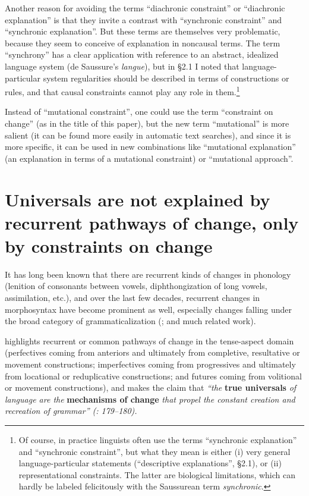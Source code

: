 \documentclass[output=paper]{langsci/langscibook}
\begin{document}
Another reason for avoiding the terms “diachronic constraint” or “diachronic explanation” is that they invite a contrast with “synchronic constraint” and “synchronic explanation”. But these terms are themselves very problematic, because they seem to conceive of explanation in noncausal terms. The term “synchrony” has a clear application with reference to an abstract, idealized language system (de Saussure’s \textit{langue}), but in §2.1 I noted that language-particular system regularities should be described in terms of constructions or rules, and that causal constraints cannot play any role in them.\footnote{Of course, in practice linguists often use the terms “synchronic explanation” and “synchronic constraint”, but what they mean is either (i) very general language-particular statements (“descriptive explanations”, §2.1), or (ii) representational constraints. The latter are biological limitations, which can hardly be labeled felicitously with the Saussurean term \textit{synchronic}.} 

Instead of “mutational constraint”, one could use the term “constraint on change” (as in the title of this paper), but the new term “mutational” is more salient (it can be found more easily in automatic text searches), and since it is more specific, it can be used in new combinations like “mutational explanation” (an explanation in terms of a mutational constraint) or “mutational approach”.

\section{Universals are not explained by recurrent pathways of change, only by constraints on change}\label{sec:haspelmath:4}

It has long been known that there are recurrent kinds of changes in phonology (lenition of consonants between vowels, diphthongization of long vowels, assimilation, etc.), and over the last few decades, recurrent changes in morphosyntax have become prominent as well, especially changes falling under the broad category of grammaticalization (\citealt{Lehmann1982,HeineEtAl1991,BybeeEtAl1994}; and much related work).

\citet{Bybee2006} highlights recurrent or common pathways of change in the tense-aspect domain (perfectives coming from anteriors and ultimately from completive, resultative or movement constructions; imperfectives coming from progressives and ultimately from locational or reduplicative constructions; and futures coming from volitional or movement constructions), and makes the claim that \emph{“\textup{the} }\textbf{{true universals}}\emph{ \textup{of} \emph{language are the} }\textbf{{mechanisms of change}}\emph{ \emph{that propel the constant creation and recreation of grammar” (\citealt{Bybee2006}: 179–180).}}
\end{document}
